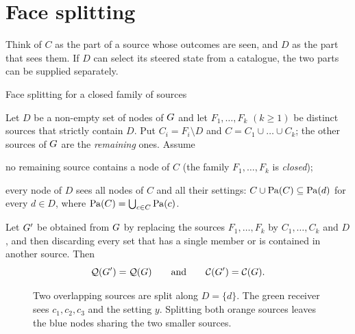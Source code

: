 \section{Face splitting}\label{sec:split}
Think of $C$ as the part of a source whose outcomes are seen, and $D$ as the part that sees them.
If $D$ can select its steered state from a catalogue, the two parts can be supplied separately.

\begin{rulebox}{Face splitting for a closed family of sources}
\begin{theorem}\label{thm:split}
Let $D$ be a non-empty set of nodes of $G$ and let $F_1,\dots,F_k$ $(k\ge 1)$ be distinct sources that strictly
contain $D$. Put $C_i=F_i\setminus D$ and $C=C_1\cup\dots\cup C_k$; the other sources of $G$ are the
\emph{remaining} ones. Assume
\begin{description}[leftmargin=1.9cm,style=nextline,itemsep=1pt]
\item[(S1) closure] no remaining source contains a node of $C$ (the family $F_1,\dots,F_k$ is \emph{closed});
\item[(S2) visibility] every node of $D$ sees all nodes of $C$ and all their settings:
  $C\cup\mathrm{Pa}(C)\subseteq\mathrm{Pa}(d)$ for every $d\in D$, where $\mathrm{Pa}(C)=\bigcup_{c\in C}\mathrm{Pa}(c)$.
\end{description}
Let $G'$ be obtained from $G$ by replacing the sources $F_1,\dots,F_k$ by $C_1,\dots,C_k$ and $D$, and then
discarding every set that has a single member or is contained in another source. Then
\[
\mathcal{Q}(G')=\mathcal{Q}(G)\qquad\text{and}\qquad\mathcal{C}(G')=\mathcal{C}(G).
\]
\end{theorem}
\end{rulebox}

\begin{figure}[H]
\centering
{}
\caption{Two overlapping sources are split along $D=\{d\}$. The green receiver sees $c_1,c_2,c_3$ and the setting $y$. Splitting both orange sources leaves the blue nodes sharing the two smaller sources.}
\label{fig:split-generic}
\end{figure}


